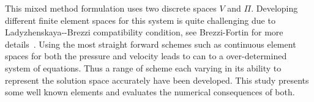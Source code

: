 This mixed method formulation uses two discrete spaces $V$ and $\Pi$.
Developing different finite element spaces for this system is quite challenging
due to Ladyzhenskaya-\babuska-Brezzi compatibility condition, see
Brezzi-Fortin for more details~\cite{BrezziFortin1991}.  Using the
most straight forward schemes such as continuous element spaces for both the
pressure and velocity leads to can to a over-determined system of equations.
Thus a range of scheme each varying in its ability to represent the solution
space accurately have been developed. This study presents some well known
elements and evaluates the numerical consequences of both.

\begin{figure}
  \centering
  \hspace{2em}

\end{figure}
